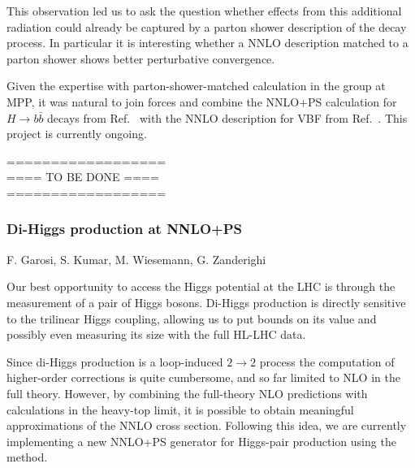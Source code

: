 \documentclass{FBR_Bericht_2025}
\begin{document}
\begin{refsection}
This observation led us to ask the question whether effects from this
additional radiation could already be captured by a parton shower description
of the decay process. In particular it is interesting whether a NNLO
description matched to a parton shower shows better perturbative convergence.

Given the expertise with parton-shower-matched calculation in the group at MPP,
it was natural to join forces and combine the NNLO+PS calculation for $H \to
b\bar{b}$ decays from Ref.~\cite{Bizon:2019tfo} with the NNLO description for
VBF from Ref.~\cite{Asteriadis:2021gpd}. This project is currently ongoing.

%
{\color{red} ==================\\ ====\; TO BE DONE\; ====\\ ==================}
%
\subsubsection{Di-Higgs production at NNLO+PS}
\begin{Namen}
F. Garosi, S. Kumar, M. Wiesemann, G. Zanderighi
\end{Namen}

Our best opportunity to access the Higgs potential at the LHC is through the measurement
of a pair of Higgs bosons. Di-Higgs production is directly sensitive to the trilinear Higgs coupling,
allowing us to put bounds on its value and possibly even measuring its size with the full HL-LHC data.

Since di-Higgs production is a loop-induced $2\to 2$ process the computation of higher-order 
corrections is quite cumbersome, and so far limited to NLO in the full theory. However, by combining
the full-theory NLO predictions with calculations in the heavy-top limit, it is possible to obtain 
meaningful approximations of the NNLO cross section. Following this idea, we are currently 
implementing a new NNLO+PS generator for Higgs-pair production using the \minnlo{} method.


\printbibliography[heading=subbibliography]
\end{refsection}

\end{document}

